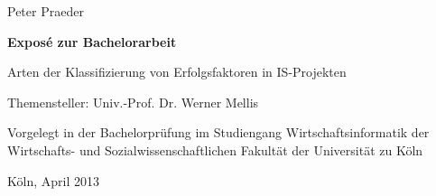 \vspace*{1mm}

\thispagestyle{empty}
Peter Praeder

\vspace*{23mm}

\begin{center}
\textbf{
Exposé zur Bachelorarbeit}
\end{center}

\vspace*{20mm}

\begin{center}
\LARGE 
    Arten der Klassifizierung von Erfolgsfaktoren in IS-Projekten
\end{center}

\vspace*{8mm}

\begin{center}
    Themensteller: Univ.-Prof. Dr. Werner Mellis
\end{center}

\vspace*{12mm}

\begin{center}
    Vorgelegt in der Bachelorprüfung
\linebreak
    im Studiengang Wirtschaftsinformatik
\linebreak
    der Wirtschafts- und Sozialwissenschaftlichen Fakultät
\linebreak
    der Universität zu Köln
\end{center}
\vspace*{30mm}

\begin{center}
Köln, April 2013
\end{center}
